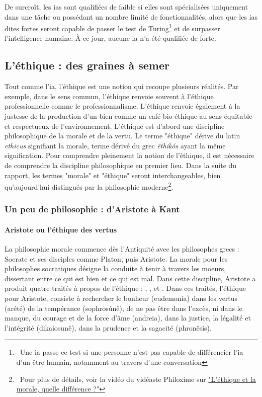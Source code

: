 De surcroît, les \glspl{ia} sont qualifiées de faible si elles sont spécialisées uniquement dans une tâche ou possédant un nombre limité de fonctionnalités, alors que les \glspl{ia} dites fortes seront capable de passer le test de Turing\footnote{~Une \gls{ia} passe ce test si une personne n'est pas capable de différencier l'\gls{ia} d'un être humain, notamment au travers d'une conversation} et de surpasser l'intelligence humaine. À ce jour, aucune \gls{ia} n'a été qualifiée de forte.

\subsection{L'éthique : des graines à semer}\label{subsection:ethique}

Tout comme l'\gls{ia}, l'éthique est une notion qui recoupe plusieurs réalités. Par exemple, dans le sens commun, l'éthique renvoie souvent à l'éthique professionnelle comme le professionnalisme. L'éthique renvoie également à la justesse de la production d'un bien comme un café bio-éthique au sens équitable et respectueux de l'environnement.
L'éthique est d'abord une discipline philosophique de la morale et de la vertu. Le terme "éthique" dérive du latin \textit{ethicus} signifiant la morale, terme dérivé du grec \textit{êthikós} ayant la même signification. Pour comprendre pleinement la notion de l'éthique, il est nécessaire de comprendre la discipline philosophique en premier lieu. Dans la suite du rapport, les termes "morale" et "éthique" seront interchangeables, bien qu'aujourd'hui distingués par la philosophie moderne\footnote{~Pour plus de détails, voir la vidéo du vidéaste Philoxime sur  \href{https://tournesol.app/entities/yt:HTAXqpMKm8M}{"L'éthique et la morale, quelle différence ?"}}.

\subsubsection{Un peu de philosophie : d'Aristote à Kant}

\paragraph{Aristote ou l'éthique des vertus}

La philosophie morale commence dès l'Antiquité avec les philosophes grecs : Socrate et ses disciples comme Platon, puis Aristote. La morale pour les philosophes socratiques désigne la conduite à tenir à travers les moeurs, dissertant entre ce qui est bien et ce qui est mal. Dans cette discipline, Aristote a produit quatre traités à propos de l'éthique : , ,  et . Dans ces traités, l'éthique pour Aristote, consiste à rechercher le bonheur (eudemonia) dans les vertus (arété) de la tempérance (sophrosúnê), de ne pas être dans l'excès, ni dans le manque, du courage et de la force d'âme (andreia), dans la justice, la légalité et l'intégrité (dikaiosunê), dans la prudence et la sagacité (phronêsis).

